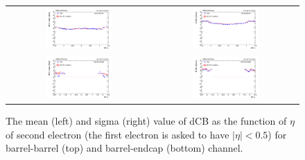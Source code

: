 \begin{figure}[ht]
  \begin{center}
    \begin{tabular}{cc}
      \includegraphics[width=0.48\textwidth]{figures/Zprime/2017/mass_resolution/scale_check/h_float_eta_Mee_BB_scale} &
      \includegraphics[width=0.48\textwidth]{figures/Zprime/2017/mass_resolution/scale_check/h_float_eta_Mee_BB_resolution} \\
      \includegraphics[width=0.48\textwidth]{figures/Zprime/2017/mass_resolution/scale_check/h_endcap_eta_Mee_BE_scale} &
      \includegraphics[width=0.48\textwidth]{figures/Zprime/2017/mass_resolution/scale_check/h_endcap_eta_Mee_BE_resolution}
    \end{tabular}
    \caption{The mean (left) and sigma (right) value of dCB as the function of $\eta$ of second electron (the first electron is asked to have $|\eta|<0.5$) for barrel-barrel (top) and barrel-endcap (bottom) channel.
    \label{fig:data_MC_eta_BB_BE}}
  \end{center}
\end{figure}





